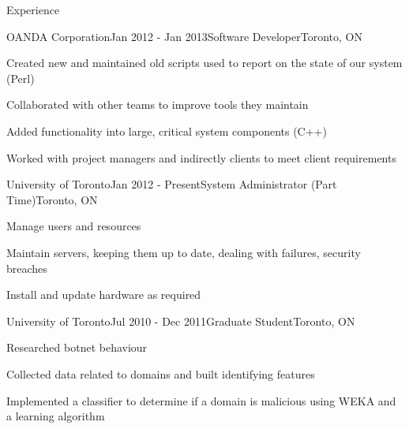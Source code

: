 \documentclass{resume}
\begin{document}
  \begin{rSection}{Experience}
    \begin{rSubsection}{OANDA Corporation}{Jan 2012 - Jan 2013}{Software Developer}{Toronto, ON}
      \item Created new and maintained old scripts used to report on the state of our system (Perl)
      \item Collaborated with other teams to improve tools they maintain
      \item Added functionality into large, critical system components (C++)
      \item Worked with project managers and indirectly clients to meet client requirements
    \end{rSubsection}

\begin{comment}
    \begin{rSubsection}{OANDA Corporation}{Jan 2012 - Mar 2012}{Integrator}{Toronto, ON}
      \item Deployed software packages in a testing environment
      \item Detected and stopped bugs before software reached production machines
      \item Learned the software system on a broad, high level
      \item Interacted and collaborated with members of many other teams across
    \end{rSubsection}
\end{comment}

    \begin{rSubsection}{University of Toronto}{Jan 2012 - Present}{System Administrator (Part Time)}{Toronto, ON}
      \item Manage users and resources
      \item Maintain servers, keeping them up to date, dealing with failures, security breaches
      \item Install and update hardware as required
    \end{rSubsection}

    \begin{rSubsection}{University of Toronto}{Jul 2010 - Dec 2011}{Graduate Student}{Toronto, ON}
      \item Researched botnet behaviour
      \item Collected data related to domains and built identifying features
      \item Implemented a classifier to determine if a domain is malicious using WEKA and a learning algorithm
    \end{rSubsection}


\end{rSection}
\end{document}

